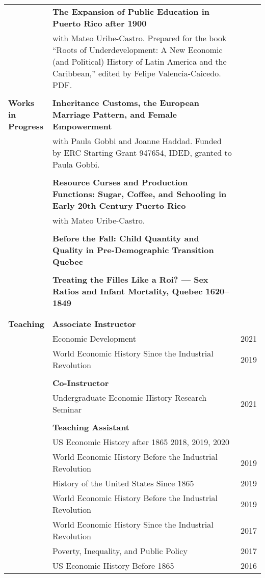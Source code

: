 \documentclass[a4paper,11pt,oneside]{article}
\begin{document}
\begin{longtable}{@{} p{0.175\linewidth} p{0.775\linewidth} p{0.05\linewidth}}
      & \textbf{The Expansion of Public Education in Puerto Rico after 1900} &\\

      & with Mateo Uribe-Castro. Prepared for the book ``Roots of Underdevelopment: A New Economic (and Political) History of Latin America and the Caribbean,'' edited by Felipe Valencia-Caicedo. PDF. & \\
  \\


     
     \textbf{\large{Works in \(\phantom{1}\) Progress}}           & \textbf{Inheritance Customs, the European Marriage Pattern, and Female Empowerment}\\ 
     &  with Paula Gobbi and Joanne Haddad. Funded by ERC Starting Grant 947654, IDED, granted to Paula Gobbi. &  \\
       \\
       &  \textbf{Resource Curses and Production Functions: Sugar, Coffee, and Schooling in Early 20th Century Puerto Rico} \\ 
      &  with  Mateo Uribe-Castro. \\
      \\
      &  \textbf{Before the Fall: Child Quantity and Quality in
      Pre-Demographic Transition Quebec} \\ 
      &   \\
      &  \textbf{Treating the Filles Like a Roi? --- Sex Ratios and Infant Mortality, Quebec 1620--1849} \\ 
      &   \\
      \\


     \textbf{\large{Teaching}} &  \textbf{Associate Instructor} & \\
      & Economic Development & \hfill 2021\\
     &  World Economic History Since the Industrial Revolution &\hfill 2019\\
     \\ 
     &   \textbf{Co-Instructor} \\
     & Undergraduate Economic History Research Seminar & \hfill  2021 \\
     \\ 
     & \textbf{Teaching Assistant} &\\

     &  \multicolumn{2}{l}{ US Economic History after 1865 \hfill 2018, 2019, 2020 }\\
     &  World Economic History Before the Industrial Revolution & \hfill 2019\\
     &  History of the United States Since 1865 & \hfill 2019\\
     &  World Economic History Before the Industrial Revolution & \hfill 2019\\
     &  World Economic History Since the Industrial Revolution & \hfill 2017\\
     &  Poverty, Inequality, and Public Policy & \hfill 2017\\
     &  US Economic History Before 1865 & \hfill 2016 \\


\end{longtable}
\end{document}
